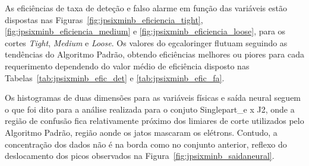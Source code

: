 As eficiências de taxa de deteção e falso alarme em função das variáveis estão
dispostas nas Figuras~\ref{fig:jpsixminb_eficiencia_tight},
\ref{fig:jpsixminb_eficiencia_medium} e \ref{fig:jpsixminb_eficiencia_loose},
para os cortes \emph{Tight}, \emph{Medium} e \emph{Loose}. Os valores do
\gls{egcaloringer} flutuam seguindo as tendências do Algoritmo Padrão, obtendo
eficiências melhores ou piores para cada requerimento dependendo do valor médio de 
eficiência disposto nas Tabelas~\ref{tab:jpsixminb_efic_det} e
\ref{tab:jpsixminb_efic_fa}.

Os histogramas de duas dimensões para as variáveis físicas e saída neural seguem
o que foi dito para a análise realizada para o conjuto Singlepart\_e x J2, onde
a região de confusão fica relativamente próximo dos limiares de corte utilizados
pelo Algoritmo Padrão, região aonde os jatos mascaram os elétrons.
Contudo, a concentração dos dados não é na borda como no conjunto anterior, 
reflexo do deslocamento dos picos observados na Figura~\ref{fig:jpsixminb_saidaneural}.


\begin{sidewaysfigure}[phb]
\centering
{}
\label{fig:jpsixminb_eficiencia_tight}
\caption{Comparações das eficiências em função das variáveis $\eta$ e $E_{T}$
para ambos algoritmos no requerimento \emph{Loose}. Conjunto JPsi x Minbias.}
\end{sidewaysfigure}

\begin{sidewaysfigure}[phb]
\centering
{}
\label{fig:jpsixminb_eficiencia_medium}
\caption{Comparações das eficiências em função das variáveis $\eta$ e $E_{T}$
para ambos algoritmos no requerimento \emph{Medium}. Conjunto JPsi x Minbias.}
\end{sidewaysfigure}

